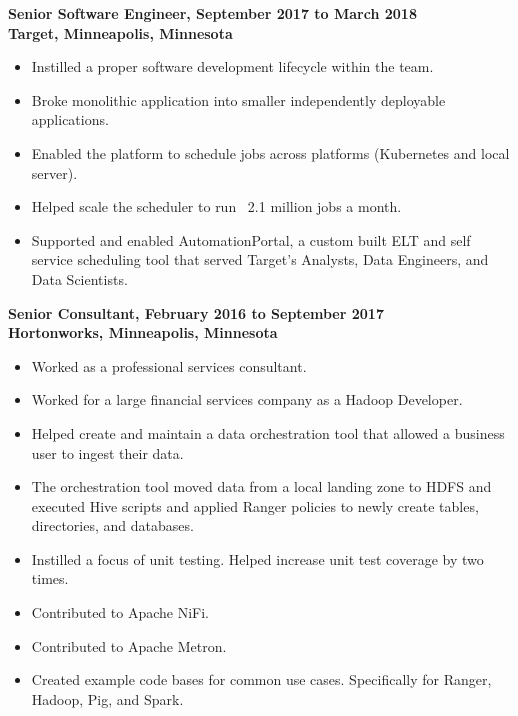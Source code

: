\documentclass[margin]{res}
\begin{document}
\begin{resume}
 {\bf Senior Software Engineer, September 2017 to March 2018\\
 Target, Minneapolis, Minnesota}
 \begin{itemize} \itemsep -2pt
 \item Instilled a proper software development lifecycle within the team.
 \item Broke monolithic application into smaller independently deployable applications.
 \item Enabled the platform to schedule jobs across platforms (Kubernetes and local server).
 \item Helped scale the scheduler to run ~2.1 million jobs a month.
 \item Supported and enabled AutomationPortal, a custom built ELT and self service scheduling tool that served Target's Analysts, Data Engineers, and Data Scientists.
 \end{itemize}

 {\bf  Senior Consultant, February 2016 to September 2017\\
 Hortonworks, Minneapolis, Minnesota}
 \begin{itemize} \itemsep -2pt
 \item Worked as a professional services consultant.
 \item Worked for a large financial services company as a Hadoop Developer. 
 \item Helped create and maintain a data orchestration tool that allowed a business user to ingest their data.
 \item The orchestration tool moved data from a local landing zone to HDFS and executed Hive scripts and applied Ranger policies to newly create tables, directories, and databases.
 \item Instilled a focus of unit testing. Helped increase unit test coverage by two times.
 \item Contributed to Apache NiFi.
 \item Contributed to Apache Metron.
 \item Created example code bases for common use cases. Specifically for Ranger, Hadoop, Pig, and Spark.
 \end{itemize}
 

\end{resume}
\end{document}
